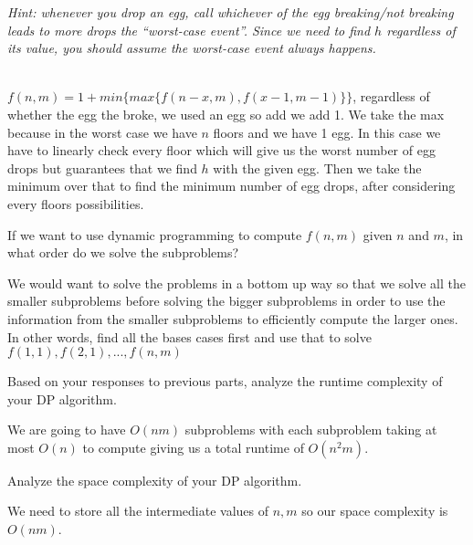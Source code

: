 \documentclass[11pt]{article}
\begin{document}
\begin{subparts}
\emph{Hint: whenever you drop an egg, call whichever of the egg breaking/not breaking leads to more drops the ``worst-case event''. Since we need to find $h$ regardless of its value, you should assume the worst-case event always happens.}\\
\begin{solution}\\
    $f(n, m) = 1 + min\{max\{f(n-x, m), f(x-1, m-1)\}\}$, regardless of whether the egg the broke, we used an egg so add we add 1. We take the max because in the worst case we have $n$ floors and
    we have 1 egg. In this case we have to linearly check every floor which will give us the worst number of egg drops but guarantees that we find $h$ with the given egg.
    Then we take the minimum over that to find the minimum number of egg drops, after considering every floors possibilities.
\end{solution}
\subpart If we want to use dynamic programming to compute $f(n, m)$ given $n$ and $m$, in what
order do we solve the subproblems?\\
\begin{solution}
    We would want to solve the problems in a bottom up way so that we solve all the smaller subproblems before solving the bigger
    subproblems in order to use the information from the smaller subproblems to efficiently compute the larger ones. In other words, find all the bases cases 
    first and use that to solve $f(1, 1), f(2, 1), ..., f(n, m)$
\end{solution}
\subpart Based on your responses to previous parts, analyze the runtime complexity of your DP algorithm.\\
\begin{solution}
    We are going to have $O(nm)$ subproblems  with each subproblem taking at most $O(n)$ to compute giving us a total runtime of $O(n^2m)$.
\end{solution}
\subpart Analyze the space complexity of your DP algorithm.\\
\begin{solution}
    We need to store all the intermediate values of $n, m$ so our space complexity is $O(nm)$.
\end{solution}


\end{subparts}
\end{document}
